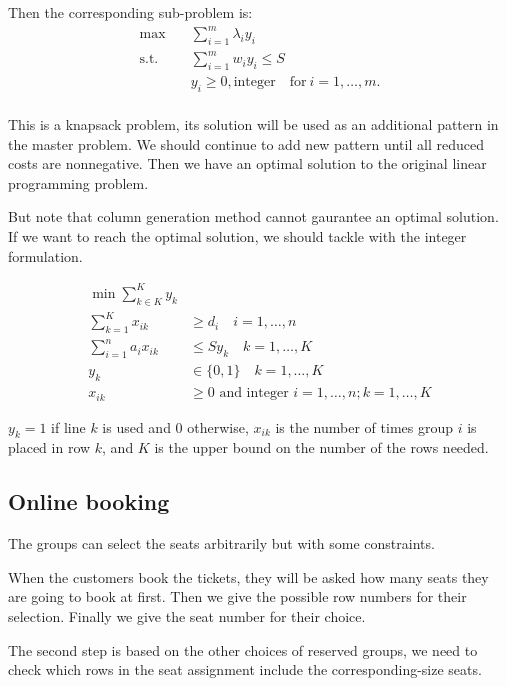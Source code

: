 Then the corresponding sub-problem is:
\[\begin{split}\mbox{max}\quad & \sum_{i=1}^m \lambda_i y_{i}\\
        \mbox{s.t.} \quad & \sum_{i=1}^m w_i y_i \leq S  \\
        & y_i \geq 0, \mbox{integer}\quad \mbox{for}~ i=1,\ldots,m.\\
\end{split}\]

This is a knapsack problem, its solution will be used as an additional pattern in the master problem.
We should continue to add new pattern until all reduced costs are nonnegative. Then we have an optimal solution to the original linear programming problem.

But note that column generation method cannot gaurantee an optimal solution. If we want to reach the optimal solution, we should tackle with the integer formulation.

\begin{equation}
\begin{aligned}
\min \sum_{k \in K}^{K} y_{k} & \\
\sum_{k=1}^{K} x_{i k} & \geq d_{i} \quad i=1, \ldots, n \\
\sum_{i=1}^{n} a_{i} x_{i k} & \leq S y_{k} \quad k=1, \ldots, K \\
y_{k} & \in\{0,1\} \quad k=1, \ldots, K \\
x_{i k} & \geq 0 \text { and integer } i=1, \ldots, n ; k=1, \ldots, K
\end{aligned}
\end{equation}

$y_k =1$ if line $k$ is used and 0 otherwise, $x_{ik}$ is the number of times group $i$ is placed in row $k$, and $K$ is the upper bound on the number of the rows needed.


\subsection{Online booking} 

The groups can select the seats arbitrarily but with some constraints.

When the customers book the tickets, they will be asked how many seats they are going to book at first. Then we give the possible row numbers for their selection. Finally we give the seat number for their choice.

The second step is based on the other choices of reserved groups, we need to check which rows in the seat assignment include the corresponding-size seats.


